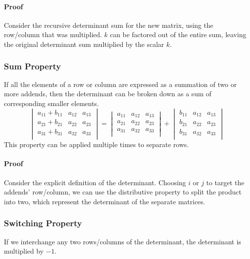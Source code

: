 \documentclass{article}
\begin{document}
\paragraph{Proof} Consider the recursive determinant sum for the new matrix, using the row/column that was multiplied. $k$ can be factored out of the entire sum, leaving the original determinant sum multiplied by the scalar $k$.

\subsubsection{Sum Property} \label{det-sum}
If all the elements of a row or column are expressed as a summation of two or more addends, then the determinant can be broken down as a sum of corresponding smaller elements.
$$
    \begin{vmatrix}
        a_{11} + b_{11} & a_{12} & a_{13} \\
        a_{21} + b_{21} & a_{22} & a_{23} \\
        a_{31} + b_{31} & a_{32} & a_{33} \\
    \end{vmatrix}
    =
    \begin{vmatrix}
        a_{11} & a_{12} & a_{13} \\
        a_{21} & a_{22} & a_{23} \\
        a_{31} & a_{32} & a_{33} \\
    \end{vmatrix}
    +
    \begin{vmatrix}
        b_{11} & a_{12} & a_{13} \\
        b_{21} & a_{22} & a_{23} \\
        b_{31} & a_{32} & a_{33} \\
    \end{vmatrix}
$$
This property can be applied multiple times to separate rows.

\paragraph{Proof} Consider the explicit definition of the determinant. Choosing $i$ or $j$ to target the addends' row/column, we can use the distributive property to split the product into two, which represent the determinant of the separate matrices.

\subsubsection{Switching Property} \label{det-switch}
If we interchange any two rows/columns of the determinant, the determinant is multiplied by $-1$.
\end{document}
